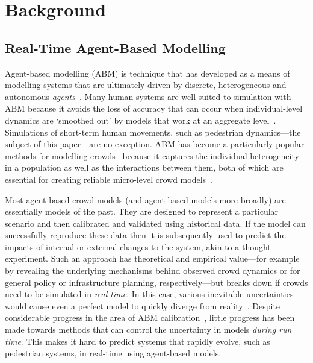 \documentclass{article}
\begin{document}
\section{Background}\label{sec:background}

\subsection{Real-Time Agent-Based Modelling}

Agent-based modelling (ABM) is technique that has developed as a means of modelling systems that are ultimately driven by discrete, heterogeneous and autonomous \textit{agents}~\cite{epstein_growing_1996, bonabeau_agent_2002}. Many human systems are well suited to simulation with ABM because it avoids the loss of accuracy that can occur when individual-level dynamics are `smoothed out' by models that work at an aggregate level~\citep{batty_agents_2005}. Simulations of short-term human movements, such as pedestrian dynamics---the subject of this paper---are no exception. ABM has become a particularly popular methods for modelling crowds~\citep{helbing_agentbased_2012} because it captures the individual heterogeneity in a population as well as the interactions between them, both of which are essential for creating reliable micro-level crowd models~\citep{xu_crowd_2014}. 

Most agent-based crowd models (and agent-based models more broadly) are essentially models of the past. They are designed to represent a particular scenario and then calibrated and validated using historical data. If the model can successfully reproduce these data then it is subsequently used to predict the impacts of internal or external changes to the system, akin to a thought experiment. Such an approach has theoretical and empirical value---for example by revealing the underlying mechanisms behind observed crowd dynamics or for general policy or infrastructure planning, respectively---but breaks down if crowds need to be simulated in \textit{real time}. In this case, various inevitable uncertainties would cause even a perfect model to quickly diverge from reality~\citep{heesterbeek_modeling_2015}.  Despite considerable progress in the area of ABM calibration~\citep{thiele_facilitating_2014, vandervaart_calibration_2015}, little progress has been made towards methods that can control the uncertainty in models \textit{during run time}. This makes it hard to predict systems that rapidly evolve, such as pedestrian systems, in real-time using agent-based models.
\end{document}
